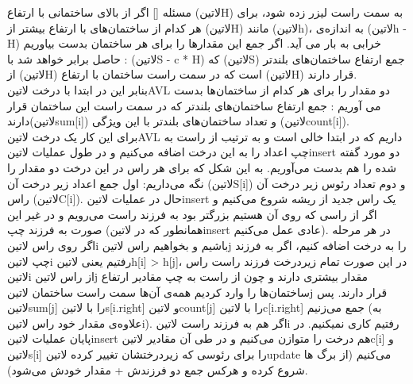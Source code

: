

‌مسئله []
اگر از بالای ساختمانی با ارتفاع (‌لاتین{H}) به سمت راست لیزر زده شود، برای هر کدام از ساختمان‌های با ارتفاع بیشتر از (‌لاتین{H}) مانند (‌لاتین{h})، به اندازه‌ی (‌لاتین{h - H}) خرابی به بار می ‌آید. اگر جمع این مقدارها را برای هر ساختمان بدست بیاوریم حاصل برابر خواهد شد با : (‌لاتین{S - c * H}) که (‌لاتین{S}) جمع ارتفاع ساختمان‌های بلندتر از (‌لاتین{H}) است که در سمت راست ساختمان با ارتفاع (‌لاتین{H}) قرار دارند. 
\\بنابر این در ابتدا با درخت ‌لاتین{AVL} دو  مقدار را برای هر کدام از ساختمان‌ها بدست می ‌آوریم :‌ جمع ارتفاع ساختمان‌های بلندتر که در سمت راست این ساختمان قرار دارند(‌لاتین{sum[i]}) و تعداد ساختمان‌های بلند‌تر با این ویژگی (‌لاتین{count[i]}).
\\برای این کار یک درخت ‌لاتین{AVL} داریم که در ابتدا خالی است و به ترتیب از راست به چپ اعداد را به این درخت اضافه می‌کنیم و در طول عملیات ‌لاتین{insert} دو مورد گفته شده را هم بدست می‌آوریم. به این شکل که برای هر راس در این درخت دو مقدار را نگه می‌داریم: اول جمع اعداد زیر درخت آن (‌لاتین{S[i]}) و دوم تعداد رئوس زیر درخت آن راس (‌لاتین{C[i]}). حال در عملیات ‌لاتین{insert} یک راس جدید از ریشه شروع می‌کنیم و اگر از راسی که روی آن هستیم بزرگتر بود به فرزند راست می‌رویم و در غیر این صورت به فرزند چپ (همانطور که در ‌لاتین{insert} عادی عمل می‌کنیم). در هر مرحله اگر روی راس ‌لاتین{i} باشیم و بخواهیم راس ‌لاتین{j} را به درخت اضافه کنیم، اگر به فرزند چپ ‌لاتین{i} رفتیم یعنی ‌لاتین{h[i] > h[j]}، در این صورت تمام زیردرخت فرزند راست راس ‌لاتین{i}  از راس ‌لاتین{j} مقدار بیشتری دارند و چون از راست به چپ مقادیر ارتفاع ساختمان‌ها را وارد کردیم همه‌‌ی آن‌ها سمت راست ساختمان ‌لاتین{j} قرار دارند. پس ‌لاتین{sum[j]} را با ‌لاتین{s[i.right]} و ‌لاتین{count[j]} را با ‌لاتین{c[i.right]} جمع می‌زنیم (به علاوه‌ی مقدار خود راس ‌لاتین{i}). اگر هم به فرزند راست ‌لاتین{i} رفتیم کاری نمیکنیم. در پایان عملیات ‌لاتین{insert} هم درخت را متوازن می‌کنیم و در طی آن مقادیر ‌لاتین{c[i]} و ‌لاتین{s[i]} را برای رئوسی که زیردرختشان تغییر کرده ‌لاتین{update} می‌کنیم (از برگ ها شروع کرده و هرکس جمع دو فرزندش + مقدار خودش می‌شود).
